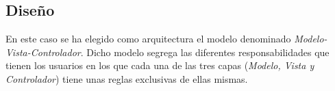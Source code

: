 \subsection{Diseño}
En este caso se ha elegido como arquitectura el modelo denominado
\textit{Modelo-Vista-Controlador}. Dicho modelo segrega las diferentes
responsabilidades que tienen los usuarios en los que cada una de las tres capas
(\textit{Modelo, Vista y Controlador}) tiene unas reglas exclusivas de ellas mismas.
